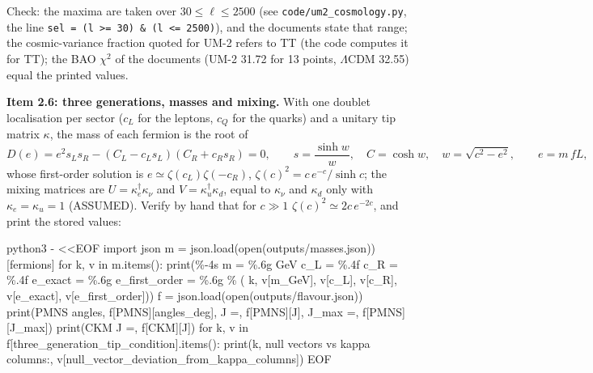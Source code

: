 \documentclass[
  10pt,
]{article}
\newenvironment{Shaded}{}{}
\newcommand{\NormalTok}[1]{#1}
\begin{document}
Check: the maxima are taken over \(30 \le \ell \le 2500\) (see
\texttt{code/um2\_cosmology.py}, the line
\texttt{sel\ =\ (l\ \textgreater{}=\ 30)\ \&\ (l\ \textless{}=\ 2500)}),
and the documents state that range; the cosmic-variance fraction quoted
for UM-2 refers to TT (the code computes it for TT); the BAO \(\chi^2\)
of the documents (UM-2 31.72 for 13 points, \(\Lambda\)CDM 32.55) equal
the printed values.

\textbf{Item 2.6: three generations, masses and mixing.} With one
doublet localisation per sector (\(c_L\) for the leptons, \(c_Q\) for
the quarks) and a unitary tip matrix \(\kappa\), the mass of each
fermion is the root of
\[ D(e) = e^2s_Ls_R - (C_L - c_Ls_L)(C_R + c_Rs_R) = 0,\qquad s = \frac{\sinh w}{w},\quad C = \cosh w,\quad w = \sqrt{c^2 - e^2},\qquad e = m\,fL, \]
whose first-order solution is \(e \simeq \zeta(c_L)\zeta(-c_R)\),
\(\zeta(c)^2 = c\,e^{-c}/\sinh c\); the mixing matrices are
\(U = \kappa_e^\dagger\kappa_\nu\) and \(V = \kappa_u^\dagger\kappa_d\),
equal to \(\kappa_\nu\) and \(\kappa_d\) only with
\(\kappa_e = \kappa_u = 1\) (ASSUMED). Verify by hand that for
\(c \gg 1\) \(\zeta(c)^2 \simeq 2c\,e^{-2c}\), and print the stored
values:

\begin{Shaded}
\begin{Highlighting}[]
\NormalTok{python3 {-} \textless{}\textless{}\textquotesingle{}EOF\textquotesingle{}}
\NormalTok{import json}
\NormalTok{m = json.load(open(\textquotesingle{}outputs/masses.json\textquotesingle{}))[\textquotesingle{}fermions\textquotesingle{}]}
\NormalTok{for k, v in m.items():}
\NormalTok{    print(\textquotesingle{}\%{-}4s m = \%.6g GeV  c\_L = \%.4f  c\_R = \%.4f  e\_exact = \%.6g  e\_first\_order = \%.6g\textquotesingle{} \% (}
\NormalTok{        k, v[\textquotesingle{}m\_GeV\textquotesingle{}], v[\textquotesingle{}c\_L\textquotesingle{}], v[\textquotesingle{}c\_R\textquotesingle{}], v[\textquotesingle{}e\_exact\textquotesingle{}], v[\textquotesingle{}e\_first\_order\textquotesingle{}]))}
\NormalTok{f = json.load(open(\textquotesingle{}outputs/flavour.json\textquotesingle{}))}
\NormalTok{print(\textquotesingle{}PMNS angles\textquotesingle{}, f[\textquotesingle{}PMNS\textquotesingle{}][\textquotesingle{}angles\_deg\textquotesingle{}], \textquotesingle{} J =\textquotesingle{}, f[\textquotesingle{}PMNS\textquotesingle{}][\textquotesingle{}J\textquotesingle{}], \textquotesingle{} J\_max =\textquotesingle{}, f[\textquotesingle{}PMNS\textquotesingle{}][\textquotesingle{}J\_max\textquotesingle{}])}
\NormalTok{print(\textquotesingle{}CKM J =\textquotesingle{}, f[\textquotesingle{}CKM\textquotesingle{}][\textquotesingle{}J\textquotesingle{}])}
\NormalTok{for k, v in f[\textquotesingle{}three\_generation\_tip\_condition\textquotesingle{}].items():}
\NormalTok{    print(k, \textquotesingle{}null vectors vs kappa columns:\textquotesingle{}, v[\textquotesingle{}null\_vector\_deviation\_from\_kappa\_columns\textquotesingle{}])}
\NormalTok{EOF}
\end{Highlighting}
\end{Shaded}
\end{document}
